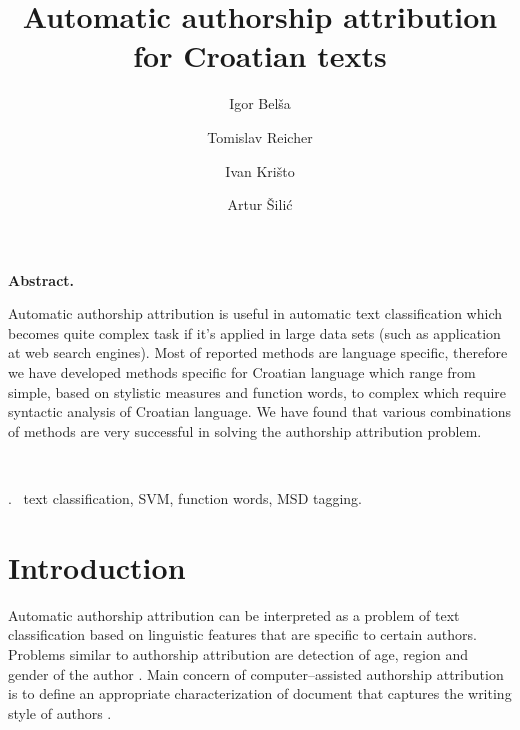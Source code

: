 \documentclass[11pt,english]{article}
\let\LaTeXtitle\title
\renewcommand{\title}[1]{\LaTeXtitle{\Large \textbf{#1}}}
\renewenvironment{abstract}
{\noindent \large \bf Abstract. \normalsize \begin{it}}
{\end{it}\\}
\newenvironment{keywords}
{\noindent {\large {\bf Keywords}}.~}{}
\begin{document}
\title{Automatic authorship attribution for Croatian texts}
\author{Igor Belša}
\author{Tomislav Reicher}
\author{Ivan Krišto}
\author{Artur Šilić}

\date{}

\maketitle

\thispagestyle{empty}
\pagestyle{empty}
\begin{multicols}{2}


\begin{abstract}
Automatic authorship attribution is useful in automatic text classification
which becomes quite complex task if it's applied in large data sets (such as
application at web search engines). Most of reported methods are language
specific, therefore we have developed methods specific for Croatian language
which range from simple, based on stylistic measures and function words, to
complex which require syntactic analysis of Croatian language. We have found that
various combinations of methods are very successful in solving the authorship
attribution problem.
\end{abstract}

\begin{keywords}
text classification, SVM, function words, MSD tagging.
\end{keywords}

\section{Introduction}
Automatic authorship attribution can be interpreted as a problem of text
classification based on linguistic features that are specific to certain authors. Problems similar to authorship
attribution are detection of age, region and gender of the author
\citep{luyckx2005shallow}. Main concern of computer--assisted authorship
attribution is to define an appropriate characterization of document that
captures the writing style of authors \citep{coyotl2006authorship}.



\end{multicols}
\end{document}
